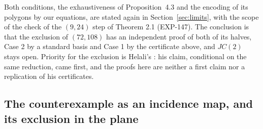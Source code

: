 \documentclass[11pt]{article}
\theoremstyle{remark}
\begin{document}
Both conditions, the exhaustiveness of Proposition~4.3 and the encoding of its polygons by our equations, are stated again in Section~\ref{sec:limits}, with the scope of the check of the $(9,24)$ step of Theorem 2.1 (EXP-147). The conclusion is that the exclusion of $(72,108)$ has an independent proof of both of its halves, Case 2 by a standard basis and Case 1 by the certificate above, and $JC(2)$ stays open. Priority for the exclusion is Helali's \cite{Helali2026}: his claim, conditional on the same reduction, came first, and the proofs here are neither a first claim nor a replication of his certificates.



\subsection{The counterexample as an incidence map, and its exclusion in the plane}\label{sec:incidence}
\end{document}
